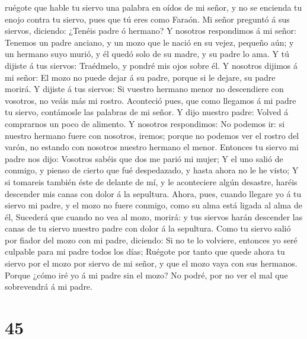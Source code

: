 ruégote que hable tu siervo una palabra en oídos de mi señor, y no se
encienda tu enojo contra tu siervo, pues que tú eres como Faraón.
 Mi señor preguntó á sus siervos, diciendo: ¿Tenéis padre ó
hermano?  Y nosotros respondimos á mi señor: Tenemos un
padre anciano, y un mozo que le nació en su vejez, pequeño aún; y un
hermano suyo murió, y él quedó solo de su madre, y su padre lo ama.
 Y tú dijiste á tus siervos: Traédmelo, y pondré mis ojos
sobre él.  Y nosotros dijimos á mi señor: El mozo no puede
dejar á su padre, porque si le dejare, su padre morirá.  Y
dijiste á tus siervos: Si vuestro hermano menor no descendiere con
vosotros, no veáis más mi rostro.  Aconteció pues, que como
llegamos á mi padre tu siervo, contámosle las palabras de mi señor.
 Y dijo nuestro padre: Volved á comprarnos un poco de
alimento.  Y nosotros respondimos: No podemos ir: si
nuestro hermano fuere con nosotros, iremos; porque no podemos ver el
rostro del varón, no estando con nosotros nuestro hermano el menor.
 Entonces tu siervo mi padre nos dijo: Vosotros sabéis que
dos me parió mi mujer;  Y el uno salió de conmigo, y pienso
de cierto que fué despedazado, y hasta ahora no le he visto;
 Y si tomareis también éste de delante de mí, y le
aconteciere algún desastre, haréis descender mis canas con dolor á la
sepultura.  Ahora, pues, cuando llegare yo á tu siervo mi
padre, y el mozo no fuere conmigo, como su alma está ligada al alma de
él,  Sucederá que cuando no vea al mozo, morirá: y tus
siervos harán descender las canas de tu siervo nuestro padre con dolor á
la sepultura.  Como tu siervo salió por fiador del mozo con
mi padre, diciendo: Si no te lo volviere, entonces yo seré culpable para
mi padre todos los días;  Ruégote por tanto que quede ahora
tu siervo por el mozo por siervo de mi señor, y que el mozo vaya con sus
hermanos.  Porque ¿cómo iré yo á mi padre sin el mozo? No
podré, por no ver el mal que sobrevendrá á mi padre.

\hypertarget{section-44}{%
\section{45}\label{section-44}}

